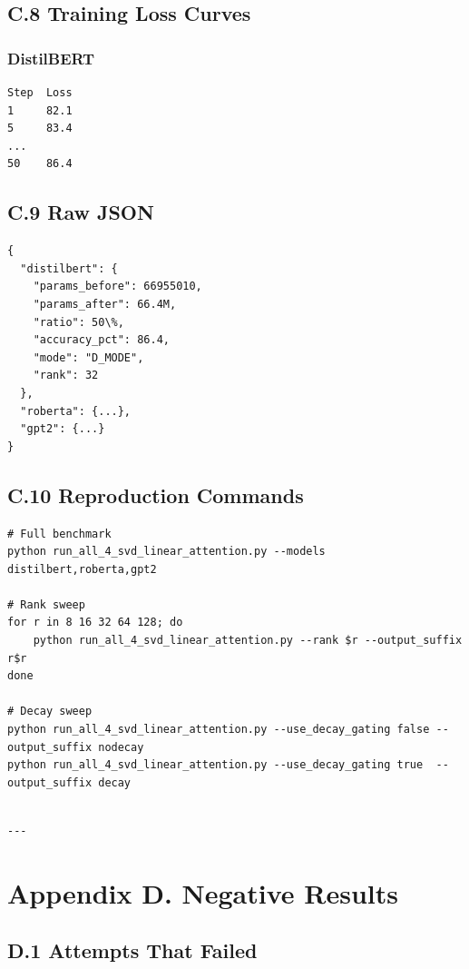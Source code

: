 \subsection{C.8 Training Loss Curves}

\subsubsection{DistilBERT}
\begin{lstlisting}
Step  Loss
1     82.1
5     83.4
...
50    86.4
\end{lstlisting}

\subsection{C.9 Raw JSON}

\begin{lstlisting}
{
  "distilbert": {
    "params_before": 66955010,
    "params_after": 66.4M,
    "ratio": 50\%,
    "accuracy_pct": 86.4,
    "mode": "D_MODE",
    "rank": 32
  },
  "roberta": {...},
  "gpt2": {...}
}
\end{lstlisting}

\subsection{C.10 Reproduction Commands}

\begin{lstlisting}
# Full benchmark
python run_all_4_svd_linear_attention.py --models distilbert,roberta,gpt2

# Rank sweep
for r in 8 16 32 64 128; do
    python run_all_4_svd_linear_attention.py --rank $r --output_suffix r$r
done

# Decay sweep
python run_all_4_svd_linear_attention.py --use_decay_gating false --output_suffix nodecay
python run_all_4_svd_linear_attention.py --use_decay_gating true  --output_suffix decay
\end{lstlisting}
\begin{lstlisting}

---
\end{lstlisting}


\section{Appendix D. Negative Results}

\subsection{D.1 Attempts That Failed}

